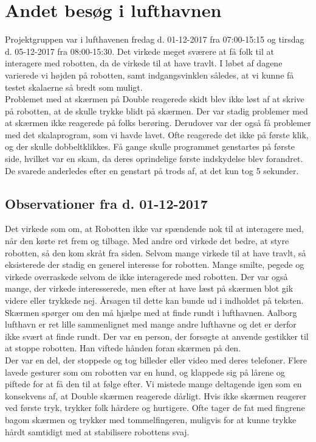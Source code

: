 \section{Andet besøg i lufthavnen}
\label{TestAfSkalaLufthavnsBesog}
%
Projektgruppen var i lufthavenen fredag d. 01-12-2017 fra 07:00-15:15 og tirsdag d. 05-12-2017 fra 08:00-15:30. Det virkede meget sværere at få folk til at interagere med robotten, da de virkede til at have travlt. I løbet af dagene varierede vi højden på robotten, samt indgangsvinklen således, at vi kunne få testet skalaerne så bredt som muligt.\\

Problemet med at skærmen på Double reagerede skidt blev ikke løst af at skrive på robotten, at de skulle trykke blidt på skærmen. Der var stadig problemer med at skærmen ikke reagerede på folks berøring. Derudover var der også få problemer med det skalaprogram, som vi havde lavet. Ofte reagerede det ikke på første klik, og der skulle dobbeltklikkes. Få gange skulle programmet genstartes på første side, hvilket var en skam, da deres oprindelige første indskydelse blev forandret. De svarede anderledes efter en genstart på trods af, at det kun tog 5 sekunder.

\subsection{Observationer fra d. 01-12-2017}
Det virkede som om, at Robotten ikke var spændende nok til at interagere med, når den kørte ret frem og tilbage. Med andre ord virkede det bedre, at styre robotten, så den kom skråt fra siden.
Selvom mange virkede til at have travlt, så eksisterede der stadig en generel interesse for robotten. Mange smilte, pegede og virkede overraskede selvom de ikke interagerede med robotten. Der var også mange, der virkede interesserede, men efter at have læst på skærmen blot gik videre eller trykkede nej. Årsagen til dette kan bunde ud i indholdet på teksten. Skærmen spørger om den må hjælpe med at finde rundt i lufthavnen. Aalborg lufthavn er ret lille sammenlignet med mange andre lufthavne og det er derfor ikke svært at finde rundt. Der var en person, der forsøgte at anvende gestikker til at stoppe robotten. Han viftede hånden foran skærmen på den.\\
Der var en del, der stoppede og tog billeder eller video med deres telefoner. Flere lavede gesturer som om robotten var en hund, og klappede sig på lårene og piftede for at få den til at følge efter. Vi mistede mange deltagende igen som en konsekvens af, at Double skærmen reagerede dårligt. Hvis ikke skærmen reagerer ved første tryk, trykker folk hårdere og hurtigere. Ofte tager de fat med fingrene bagom skærmen og trykker med tommelfingeren, muligvis for at kunne trykke hårdt samtidigt med at stabilisere robottens svaj.

